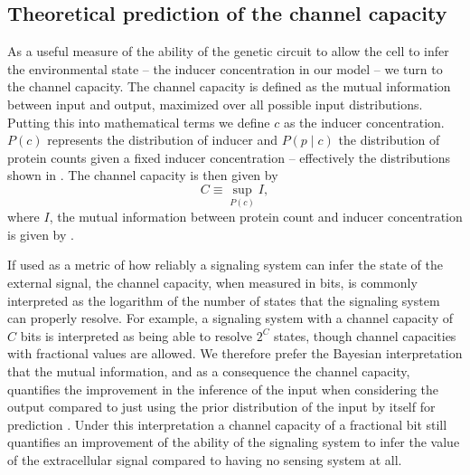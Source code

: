 \subsection{Theoretical prediction of the channel capacity}
\label{sec_channcap}

As a useful measure of the ability of the genetic circuit to allow the cell to
infer the environmental state -- the inducer concentration in our model -- we
turn to the channel capacity. The channel capacity is defined as the mutual
information between input and output, maximized over all possible input
distributions. Putting this into mathematical terms we define $c$ as the
inducer concentration. $P(c)$ represents the distribution of inducer and $P(p
\mid c)$ the distribution of protein counts given a fixed inducer concentration
-- effectively the distributions shown in . The channel
capacity is then given by
\begin{equation}
  C \equiv \sup_{P(c)} I,
  \label{eq_chann_cap}
\end{equation}
where $I$, the mutual information between protein count and inducer
concentration is given by .

If used as a metric of how reliably a signaling system can infer the state of
the external signal, the channel capacity, when measured in bits, is commonly
interpreted as the logarithm of the number of states that the signaling system
can properly resolve. For example, a signaling system with a channel capacity
of $C$ bits is interpreted as being able to resolve $2^C$ states, though
channel capacities with fractional values are allowed. We therefore prefer
the Bayesian interpretation that the mutual information, and as a consequence
the channel capacity, quantifies the improvement in the inference of the input
when considering the output compared to just using the prior distribution of
the input by itself for prediction \cite{Voliotis2014a, Bowsher2014}. Under
this interpretation a channel capacity of a fractional bit still quantifies an
improvement of the ability of the signaling system to infer the value of the
extracellular signal compared to having no sensing system at all.

